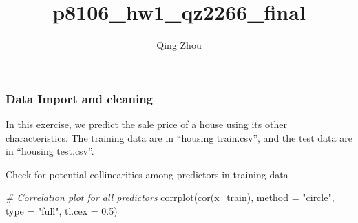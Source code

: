 \documentclass[
]{article}
\title{p8106\_hw1\_qz2266\_final}
\author{Qing Zhou}
\date{}
\newenvironment{Shaded}{\begin{snugshade}}{\end{snugshade}}
\newcommand{\AttributeTok}[1]{\textcolor[rgb]{0.77,0.63,0.00}{#1}}
\newcommand{\CommentTok}[1]{\textcolor[rgb]{0.56,0.35,0.01}{\textit{#1}}}
\newcommand{\DecValTok}[1]{\textcolor[rgb]{0.00,0.00,0.81}{#1}}
\newcommand{\FloatTok}[1]{\textcolor[rgb]{0.00,0.00,0.81}{#1}}
\newcommand{\FunctionTok}[1]{\textcolor[rgb]{0.00,0.00,0.00}{#1}}
\newcommand{\NormalTok}[1]{#1}
\newcommand{\OtherTok}[1]{\textcolor[rgb]{0.56,0.35,0.01}{#1}}
\newcommand{\SpecialCharTok}[1]{\textcolor[rgb]{0.00,0.00,0.00}{#1}}
\newcommand{\StringTok}[1]{\textcolor[rgb]{0.31,0.60,0.02}{#1}}
\begin{document}
\maketitle

{
\setcounter{tocdepth}{2}
\tableofcontents
}
\hypertarget{data-import-and-cleaning}{%
\subsubsection{Data Import and
cleaning}\label{data-import-and-cleaning}}

In this exercise, we predict the sale price of a house using its other
characteristics. The training data are in ``housing train.csv'', and the
test data are in ``housing test.csv''.

\begin{Shaded}
\end{Shaded}

Check for potential collinearities among predictors in training data

\begin{Shaded}
\begin{Highlighting}[]
\CommentTok{\# Correlation plot for all predictors}
\FunctionTok{corrplot}\NormalTok{(}\FunctionTok{cor}\NormalTok{(x\_train), }\AttributeTok{method =} \StringTok{"circle"}\NormalTok{, }\AttributeTok{type =} \StringTok{"full"}\NormalTok{, }\AttributeTok{tl.cex =} \FloatTok{0.5}\NormalTok{)}
\end{Highlighting}
\end{Shaded}
\end{document}
